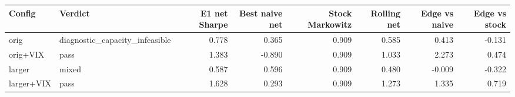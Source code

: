 \begin{tabular}{llrrrrrr}
\toprule
Config & Verdict & E1 net Sharpe & Best naive net & Stock Markowitz & Rolling net & Edge vs naive & Edge vs stock \\
\midrule
orig & diagnostic_capacity_infeasible & 0.778 & 0.365 & 0.909 & 0.585 & 0.413 & -0.131 \\
orig+VIX & pass & 1.383 & -0.890 & 0.909 & 1.033 & 2.273 & 0.474 \\
larger & mixed & 0.587 & 0.596 & 0.909 & 0.480 & -0.009 & -0.322 \\
larger+VIX & pass & 1.628 & 0.293 & 0.909 & 1.273 & 1.335 & 0.719 \\
\bottomrule
\end{tabular}
